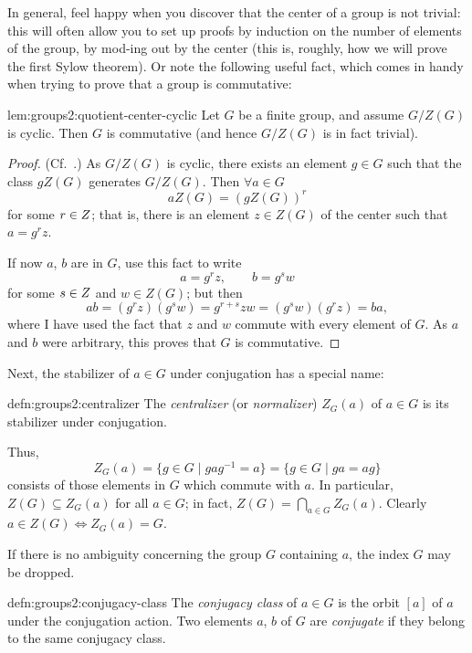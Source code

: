 In general, feel happy when you discover that the center of a group is
not trivial: this will often allow you to set up proofs by induction
on the number of elements of the group, by mod-ing out by the center
(this is, roughly, how we will prove the first Sylow theorem). Or note
the following useful fact, which comes in handy when trying to prove
that a group is commutative:

\begin{lem}{}{lem:groups2:quotient-center-cyclic}
  Let $G$ be a finite group, and assume $G/Z(G)$ is cyclic. Then $G$
  is commutative (and hence $G/Z(G)$ is in fact trivial).
\end{lem}
\begin{proof}
  (Cf.\ .) As $G/Z(G)$ is cyclic,
  there exists an element $g \in G$ such that the class $gZ(G)$
  generates $G/Z(G)$. Then $\forall a \in G$
  \[
    aZ(G) = (gZ(G))^r
  \]
  for some $r \in Z$; that is, there is an element $z \in Z(G)$ of
  the center such that $a = g^r z$.

  If now $a$, $b$ are in $G$, use this fact to write
  \[
    a = g^r z, \qquad b = g^s w
  \]
  for some $s \in Z$ and $w \in Z(G)$; but then
  \[
    ab = (g^r z)(g^s w) = g^{r+s} zw = (g^s w)(g^r z) = ba,
  \]
  where I have used the fact that $z$ and $w$ commute with every
  element of $G$. As $a$ and $b$ were arbitrary, this proves that $G$
  is commutative.
\end{proof}

Next, the stabilizer of $a \in G$ under conjugation has a special
name:

\begin{defn}{}{defn:groups2:centralizer}
  The \emph{centralizer} (or \emph{normalizer}) $Z_G(a)$ of $a \in G$
  is its stabilizer under conjugation.
\end{defn}

Thus,
\[
  Z_G(a) = \{g \in G \mid gag^{-1} = a\} = \{g \in G \mid ga = ag\}
\]
consists of those elements in $G$ which commute with $a$. In
particular, $Z(G) \subseteq Z_G(a)$ for all $a \in G$; in fact,
$Z(G) = \bigcap_{a \in G} Z_G(a)$. Clearly
$a \in Z(G) \iff Z_G(a) = G$.

If there is no ambiguity concerning the group $G$ containing $a$, the
index $G$ may be dropped.

\begin{defn}{}{defn:groups2:conjugacy-class}
  The \emph{conjugacy class} of $a \in G$ is the orbit $[a]$ of $a$
  under the conjugation action. Two elements $a$, $b$ of $G$ are
  \emph{conjugate} if they belong to the same conjugacy class.
\end{defn}

